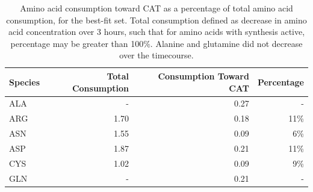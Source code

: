 \documentclass[12pt]{article}
\begin{document}
\begin{table}
\centering
    \caption{Amino acid consumption toward CAT as a percentage of total amino acid consumption, for the best-fit set. Total consumption defined as decrease in amino acid concentration over 3 hours, such that for amino acids with synthesis active, percentage may be greater than 100\%. Alanine and glutamine did not decrease over the timecourse.}
    \renewcommand{\arraystretch}{1.25}
    \begin{tabular}{lrrr} \toprule
        Species & Total Consumption & Consumption Toward CAT & Percentage \\ \hline
        ALA  & - & 0.27 & - \\ \hline
        ARG  & 1.70  & 0.18  & 11\% \\ \hline
        ASN  & 1.55  & 0.09  & 6\% \\ \hline
        ASP  & 1.87  & 0.21  & 11\% \\ \hline
        CYS  & 1.02  & 0.09  & 9\% \\ \hline
        GLN  & - & 0.21 & - \\ \hline

\end{tabular}
\end{table}
\end{document}
